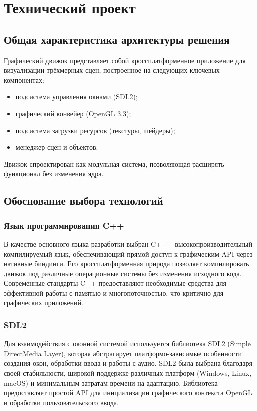 \section{Технический проект}
\subsection{Общая характеристика архитектуры решения}

Графический движок представляет собой кроссплатформенное приложение для визуализации трёхмерных сцен, построенное на следующих ключевых компонентах:
\begin{itemize}
    \item подсистема управления окнами (SDL2);
    \item графический конвейер (OpenGL 3.3);
    \item подсистема загрузки ресурсов (текстуры, шейдеры);
    \item менеджер сцен и объектов.
\end{itemize}

Движок спроектирован как модульная система, позволяющая расширять функционал без изменения ядра.

\subsection{Обоснование выбора технологий}

\subsubsection{Язык программирования C++}

В качестве основного языка разработки выбран C++ -- высокопроизводительный компилируемый язык, обеспечивающий прямой доступ к графическим API через нативные биндинги. Его кроссплатформенная природа позволяет компилировать движок под различные операционные системы без изменения исходного кода. Современные стандарты C++ предоставляют необходимые средства для эффективной работы с памятью и многопоточностью, что критично для графических приложений.

\subsubsection{SDL2}

Для взаимодействия с оконной системой используется библиотека SDL2 (Simple DirectMedia Layer), которая абстрагирует платформо-зависимые особенности создания окон, обработки ввода и работы с аудио. SDL2 была выбрана благодаря своей стабильности, широкой поддержке различных платформ (Windows, Linux, macOS) и минимальным затратам времени на адаптацию. Библиотека предоставляет простой API для инициализации графического контекста OpenGL и обработки пользовательского ввода.

